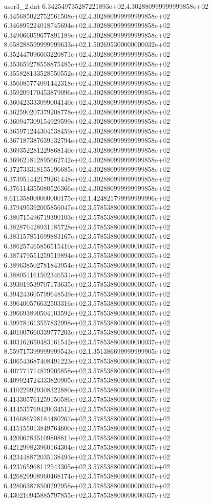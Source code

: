 \begin{filecontents}{user3_2.dat}
6.342549735287221893e+02,4.302880999999999858e+02
6.345685022752561508e+02,4.302880999999999858e+02
6.346895224018745694e+02,4.302880999999999858e+02
6.349066059677891189e+02,4.302880999999999858e+02
8.658288599999999633e+02,1.502695300000000032e+02
6.352447096603220871e+02,4.302880999999999858e+02
6.353659278558875485e+02,4.302880999999999858e+02
6.355828133528550552e+02,4.302880999999999858e+02
6.356085774091442318e+02,4.302880999999999858e+02
6.359209170453879096e+02,4.302880999999999858e+02
6.360423333099004140e+02,4.302880999999999858e+02
6.362590207379208778e+02,4.302880999999999858e+02
6.360947309154929599e+02,4.302880999999999858e+02
6.365971244304538459e+02,4.302880999999999858e+02
6.367187387639132794e+02,4.302880999999999858e+02
6.369352281229868140e+02,4.302880999999999858e+02
6.369621812895662742e+02,4.302880999999999858e+02
6.372733318155196685e+02,4.302880999999999858e+02
6.373951442179261448e+02,4.302880999999999858e+02
6.376114355080526366e+02,4.302880999999999858e+02
8.611358000000000175e+02,1.424821799999999996e+02
6.379495392005856047e+02,3.578538800000000037e+02
6.380715496719390103e+02,3.578538800000000037e+02
6.382876428931185728e+02,3.578538800000000037e+02
6.383157851699883167e+02,3.578538800000000037e+02
6.386257465856515410e+02,3.578538800000000037e+02
6.387479551259519894e+02,3.578538800000000037e+02
6.389638502781843954e+02,3.578538800000000037e+02
6.388051161502346531e+02,3.578538800000000037e+02
6.393019539707173635e+02,3.578538800000000037e+02
6.394243605799648549e+02,3.578538800000000037e+02
6.396400576632503316e+02,3.578538800000000037e+02
6.396693890504103592e+02,3.578538800000000037e+02
6.399781613557832998e+02,3.578538800000000037e+02
6.401007660339777203e+02,3.578538800000000037e+02
6.403162650483161542e+02,3.578538800000000037e+02
8.559717399999999543e+02,1.351386699999999905e+02
6.406543687408491223e+02,3.578538800000000037e+02
6.407771714879905858e+02,3.578538800000000037e+02
6.409924724333820905e+02,3.578538800000000037e+02
6.410229929308322880e+02,3.578538800000000037e+02
6.413305761259150586e+02,3.578538800000000037e+02
6.414535769420034512e+02,3.578538800000000037e+02
6.416686798184480267e+02,3.578538800000000037e+02
6.415155013849764600e+02,3.578538800000000037e+02
6.420067835109808811e+02,3.578538800000000037e+02
6.421299823960164304e+02,3.578538800000000037e+02
6.423448872035138493e+02,3.578538800000000037e+02
6.423765968112543305e+02,3.578538800000000037e+02
6.426829908960468174e+02,3.578538800000000037e+02
6.428063878500292958e+02,3.578538800000000037e+02
6.430210945885797855e+02,3.578538800000000037e+02

\end{filecontents}
